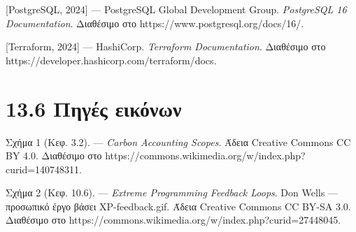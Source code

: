 {[}PostgreSQL, 2024{]} --- PostgreSQL Global Development Group.
\emph{PostgreSQL 16 Documentation}. Διαθέσιμο στο
https://www.postgresql.org/docs/16/.

{[}Terraform, 2024{]} --- HashiCorp. \emph{Terraform Documentation}.
Διαθέσιμο στο https://developer.hashicorp.com/terraform/docs.

\section{13.6 Πηγές
εικόνων}\label{ux3c0ux3b7ux3b3ux3adux3c2-ux3b5ux3b9ux3baux3ccux3bdux3c9ux3bd}

Σχήμα 1 (Κεφ. 3.2). --- \emph{Carbon Accounting Scopes}. Άδεια Creative
Commons CC BY 4.0. Διαθέσιμο στο
https://commons.wikimedia.org/w/index.php?curid=140748311.

Σχήμα 2 (Κεφ. 10.6). --- \emph{Extreme Programming Feedback Loops}. Don
Wells --- προσωπικό έργο βάσει XP-feedback.gif. Άδεια Creative Commons
CC BY-SA 3.0. Διαθέσιμο στο
https://commons.wikimedia.org/w/index.php?curid=27448045.
